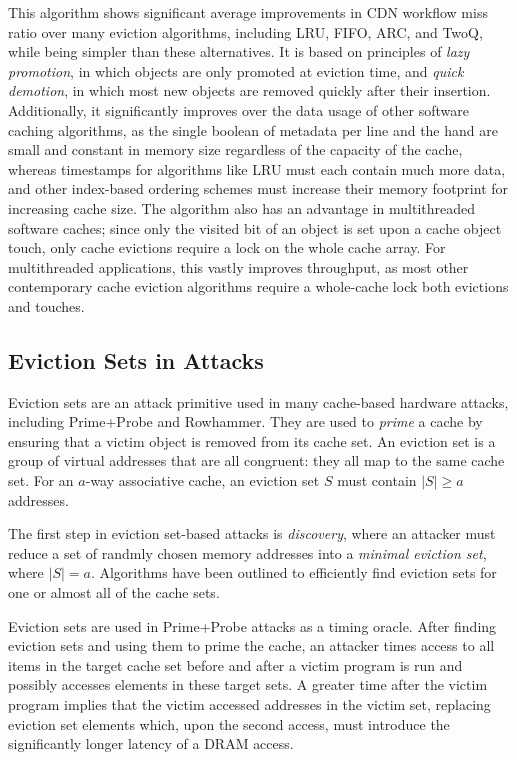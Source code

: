 \documentclass[letterpaper, twocolumn]{article}
\begin{document}
This algorithm shows significant average improvements in CDN workflow miss ratio
over many eviction algorithms,
including LRU, FIFO, ARC, and TwoQ, while being simpler than these alternatives.
It is based on principles of \textit{lazy promotion},
in which objects are only promoted at eviction time,
and \textit{quick demotion}, in which most new objects are removed quickly after their insertion.
Additionally, it significantly improves over the data usage of other
software caching algorithms, as the single boolean of metadata per line and the hand
are small and constant in memory size regardless of the capacity of the cache,
whereas timestamps for algorithms like LRU must each contain much more data,
and other index-based ordering schemes must increase their memory footprint for increasing cache size.
The algorithm also has an advantage in multithreaded software caches;
since only the visited bit of an object is set upon a cache object touch,
only cache evictions require a lock on the whole cache array.
For multithreaded applications, this vastly improves throughput,
as most other contemporary cache eviction algorithms require a whole-cache lock
both evictions and touches.

\subsection{Eviction Sets in Attacks}

Eviction sets are an attack primitive used in many cache-based hardware attacks,
including Prime+Probe and Rowhammer.
They are used to \textit{prime} a cache by ensuring that a victim object is removed from its cache set.
An eviction set is a group of virtual addresses that are all congruent: they all map to the same cache set.
For an $a$-way associative cache, an eviction set $S$ must contain $|S| \geq a$ addresses.

The first step in eviction set-based attacks is \textit{discovery},
where an attacker must reduce a set of randmly chosen memory addresses
into a \textit{minimal eviction set}, where $|S| = a$.
Algorithms have been outlined to efficiently find eviction sets for one or almost all
of the cache sets.

Eviction sets are used in Prime+Probe attacks as a timing oracle.
After finding eviction sets and using them to prime the cache,
an attacker times access to all items in the target cache set
before and after a victim program is run and possibly accesses elements in these target sets.
A greater time after the victim program implies that the victim accessed addresses in the victim set,
replacing eviction set elements which, upon the second access,
must introduce the significantly longer latency of a DRAM access.
\end{document}
